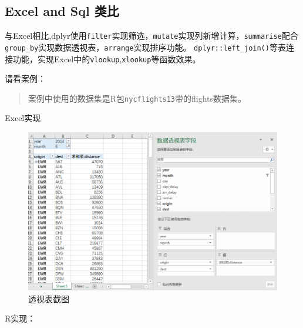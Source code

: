 \documentclass[
]{book}
\begin{document}
\hypertarget{dplyr:difference-of-sql}{%
\subsection{Excel and Sql 类比}\label{dplyr:difference-of-sql}}

与Excel相比,dplyr使用\texttt{filter}实现筛选，\texttt{mutate}实现列新增计算，\texttt{summarise}配合\texttt{group\_by}实现数据透视表，\texttt{arrange}实现排序功能。
\texttt{dplyr::left\_join()}等表连接功能，实现Excel中的\texttt{vlookup},\texttt{xlookup}等函数效果。

请看案例：

\begin{quote}
案例中使用的数据集是R包\texttt{nycflights13}带的flights数据集。
\end{quote}

Excel实现

\begin{figure}
\centering
\includegraphics{./picture/data-table/01picture.png}
\caption{透视表截图}
\end{figure}

R实现：
\end{document}
